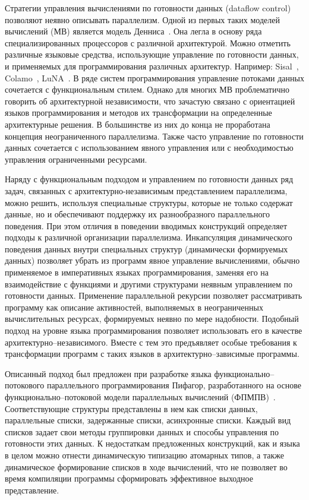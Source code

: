 Стратегии управления вычислениями по готовности данных (dataflow control) позволяют неявно описывать параллелизм. Одной из первых таких моделей вычислений (МВ) является модель Денниса~\cite{dennis}. Она легла в основу ряда специализированных процессоров с различной архитектурой. Можно отметить различные языковые средства, использующие управление по готовности данных, и применяемых для программирования различных архитектур. Например: Sisal~\cite{sisal}, Colamo~\cite{colamo}, LuNA~\cite{luna}. В ряде систем программирования управление потоками данных сочетается с функциональным стилем. Однако для многих МВ проблематично говорить об архитектурной независимости, что зачастую связано с ориентацией языков программирования и методов их трансформации на определенные архитектурные решения.  В большинстве из них до конца не проработана концепция неограниченного параллелизма. Также часто управление по готовности данных сочетается с использованием явного управления или с необходимостью управления ограниченными ресурсами.

Наряду с функциональным подходом и управлением по готовности данных ряд задач, связанных с архитектурно-независимым представлением параллелизма, можно решить, используя специальные структуры, которые не только содержат данные, но и обеспечивают поддержку их разнообразного параллельного поведения. При этом отличия в поведении вводимых конструкций определяет подходы к различной организации параллелизма. Инкапсуляция динамического поведения данных внутри специальных структур (динамически формируемых данных) позволяет убрать из программ явное управление вычислениями, обычно применяемое в императивных языках программирования, заменяя его на взаимодействие с функциями и другими структурами неявным управлением по готовности данных. Применение параллельной рекурсии позволяет рассматривать программу как описание активностей, выполняемых в неограниченных вычислительных ресурсах, формируемых неявно по мере надобности. Подобный подход на уровне языка программирования позволяет использовать его в качестве архитектурно--независимого. Вместе с тем это предъявляет особые требования к трансформации программ с таких языков в архитектурно--зависимые программы.

Описанный подход был предложен при разработке языка функционально--потокового параллельного программирования Пифагор, разработанного на основе функционально--потоковой модели параллельных вычислений (ФПМПВ)~\cite{legalov2005,asynch}. Соответствующие структуры представлены в нем как списки данных, параллельные списки, задержанные списки, асинхронные списки. Каждый вид списков задает свои методы группировки данных и способы управления по готовности этих данных. К недостаткам предложенных конструкций, как и языка в целом можно отнести динамическую типизацию атомарных типов, а также динамическое формирование списков в ходе вычислений, что не позволяет во время компиляции программы сформировать эффективное выходное представление.

